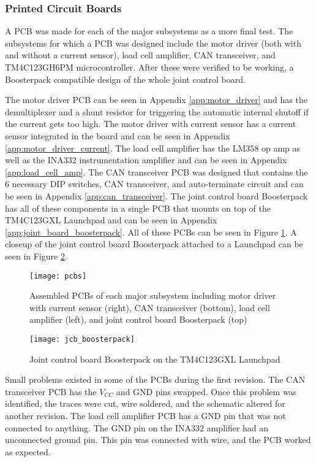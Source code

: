 \subsubsection{Printed Circuit Boards}
A PCB was made for each of the major subsystems as a more final test. The subsystems for which a PCB was designed include the motor driver (both with and without a current sensor), load cell amplifier, CAN transceiver, and TM4C123GH6PM microcontroller. After these were verified to be working, a Boosterpack compatible design of the whole joint control board.

\noindent The motor driver PCB can be seen in Appendix \ref{app:motor_driver} and has the demultiplexer and a shunt resistor for triggering the automatic internal shutoff if the current gets too high. The motor driver with current sensor has a current sensor integrated in the board and can be seen in Appendix \ref{app:motor_driver_current}. The load cell amplifier has the LM358 op amp as well as the INA332 instrumentation amplifier and can be seen in Appendix \ref{app:load_cell_amp}. The CAN transceiver PCB was designed that contains the 6 necessary DIP switches, CAN transceiver, and auto-terminate circuit and can be seen in Appendix \ref{app:can_transceiver}. The joint control board Boosterpack has all of these components in a single PCB that mounts on top of the TM4C123GXL Launchpad and can be seen in Appendix \ref{app:joint_board_boosterpack}. All of these PCBs can be seen in Figure \ref{fig:pcbs}. A closeup of the joint control board Boosterpack attached to a Launchpad can be seen in Figure \ref{fig:jcb_boosterpack}.

\begin{figure}[H]
	\centering
	\texttt{[image: pcbs]}
	\caption{Assembled PCBs of each major subsystem including motor driver with current sensor (right), CAN transceiver (bottom), load cell amplifier (left), and joint control board Boosterpack (top)}
	\label{fig:pcbs}
\end{figure}

\begin{figure}[H]
	\centering
	\texttt{[image: jcb\_boosterpack]}
	\caption{Joint control board Boosterpack on the TM4C123GXL Launchpad}
	\label{fig:jcb_boosterpack}
\end{figure}

\noindent Small problems existed in some of the PCBs during the first revision. The CAN transceiver PCB has the $V_{CC}$ and GND pins swapped. Once this problem was identified, the traces were cut, wire soldered, and the schematic altered for another revision. The load cell amplifier PCB has a GND pin that was not connected to anything. The GND pin on the INA332 amplifier had an unconnected ground pin. This pin was connected with wire, and the PCB worked as expected.

